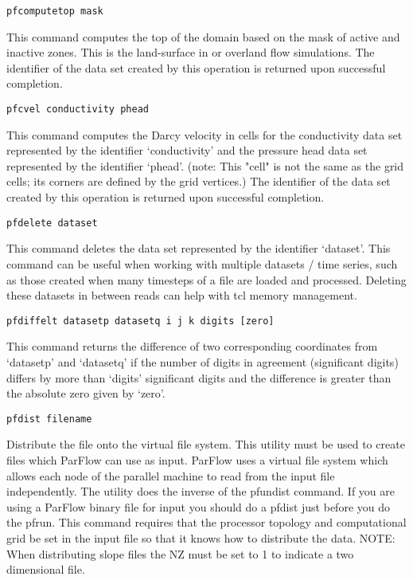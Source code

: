 \begin{description}
\item{\begin{verbatim}pfcomputetop mask\end{verbatim}} 
This command computes the top of the domain based on the mask of
 active and inactive zones.  This is the land-surface in  or
 overland flow simulations.  The identifier of the data set created by
 this operation is returned upon successful completion.

\item{\begin{verbatim}pfcvel conductivity phead\end{verbatim}}
This command computes the Darcy velocity in cells for the conductivity data set
represented by the identifier `conductivity' and the pressure head
data set represented by the identifier `phead'.  (note: This "cell"
is not the same as the grid cells; its corners are defined by the
grid vertices.)  The identifier of the data set created by this
operation is returned upon successful completion.


\item{\begin{verbatim}pfdelete dataset\end{verbatim}}
This command deletes the data set represented by the identifier `dataset'. This
command can be useful when working with multiple datasets / time series, such as
those created when many timesteps of a file are loaded and processed.  Deleting these
datasets in between reads can help with tcl memory management.
        

\item{\begin{verbatim}pfdiffelt datasetp datasetq i j k digits [zero]\end{verbatim}}
This command returns the difference of two corresponding coordinates
from `datasetp' and `datasetq' if the number of digits in agreement
(significant digits) differs by more than `digits' significant
digits and the difference is greater than the absolute zero given     
by `zero'.


\item{\begin{verbatim}pfdist filename \end{verbatim}}
Distribute the file onto the virtual file system. This utility must be used to 
create files which ParFlow can use as input. ParFlow uses a virtual file system 
which allows each node of the parallel machine to read from the input file independently. 
The utility does the inverse of the pfundist command. If you are using a ParFlow binary 
file for input you should do a pfdist just before you do the pfrun. This command
requires that the processor topology and computational grid be set in the input 
file so that it knows how to distribute the data. NOTE: When distributing slope
files the  NZ must be set to 1 to indicate a two dimensional file.  


\end{description}
